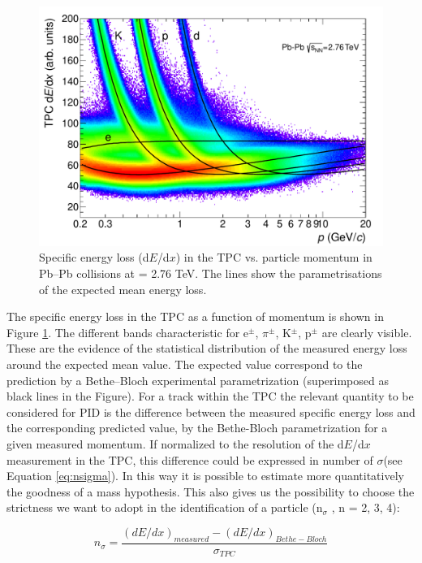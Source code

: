 \begin{figure}[htbp]
\begin{center}
\includegraphics[width=10.cm]{./Version1/FigChapter4/TPCPID}
\caption{Specific energy loss (d$E$/d$x$) in the TPC vs. particle momentum in Pb--Pb collisions at \snn= 2.76 TeV. The lines show the parametrisations of the expected mean energy loss.}
\label{fig:tpcpidPbPb}
\end{center}
\end{figure}


The specific energy loss in the TPC as a function of momentum is shown in Figure \ref{fig:tpcpidPbPb}. The different bands characteristic for e$^{\pm}$, $\pi^{\pm}$, K$^{\pm}$, p$^{\pm}$ are clearly visible. These are the evidence of the statistical distribution of the measured energy loss around the expected mean value. The expected value correspond to the prediction by a Bethe--Bloch experimental parametrization (superimposed as black lines in the Figure). For a track within the TPC the relevant quantity to be considered for PID is the difference between the measured specific energy loss and the corresponding predicted value, by the Bethe-Bloch parametrization for a given measured momentum. If normalized to the resolution of the d$E$/d$x$ measurement in the TPC, this difference could be expressed in number of $\sigma$(see Equation \ref{eq:nsigma}). In this way it is possible to estimate more quantitatively the goodness of a mass hypothesis. This also gives us the possibility to choose the strictness we want to adopt in the identification of a particle (n$_{\sigma}$ , n = 2, 3, 4):

\begin{equation}\label{eq:nsigma}
n_{\sigma} = \frac{(dE/dx)_{measured}-(dE/dx)_{Bethe-Bloch}}{\sigma_{TPC}}
\end{equation}


